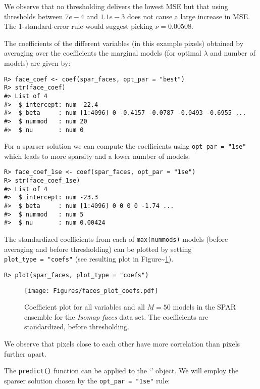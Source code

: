 \documentclass[
  article]{jss}
\newcommand{\class}[1]{`\code{#1}'}
\begin{document}
We observe that no thresholding delivers the lowest MSE but that using
thresholds between \(7e-4\) and \(1.1e-3\) does not cause a large
increase in MSE. The 1-standard-error rule would suggest picking
\(\nu=0.00508\).

The coefficients of the different variables (in this example pixels)
obtained by averaging over the coefficients the marginal models (for
optimal \(\lambda\) and number of models) are given by:

\begin{verbatim}
R> face_coef <- coef(spar_faces, opt_par = "best")
R> str(face_coef)
#> List of 4
#>  $ intercept: num -22.4
#>  $ beta     : num [1:4096] 0 -0.4157 -0.0787 -0.0493 -0.6955 ...
#>  $ nummod   : num 20
#>  $ nu       : num 0
\end{verbatim}

For a sparser solution we can compute the coefficients using
\texttt{opt\_par\ =\ "1se"} which leads to more sparsity and a lower
number of models.

\begin{verbatim}
R> face_coef_1se <- coef(spar_faces, opt_par = "1se")
R> str(face_coef_1se)
#> List of 4
#>  $ intercept: num -23.3
#>  $ beta     : num [1:4096] 0 0 0 0 -1.74 ...
#>  $ nummod   : num 5
#>  $ nu       : num 0.00424
\end{verbatim}

The standardized coefficients from each of \texttt{max(nummods)} models
(before averaging and before thresholding) can be plotted by setting
\texttt{plot\_type\ =\ "coefs"} (see resulting plot in
Figure\textasciitilde{}\ref{fig:faces_coefs}).

\begin{verbatim}
R> plot(spar_faces, plot_type = "coefs")
\end{verbatim}

\begin{figure}[t!]
\centering
\texttt{[image: Figures/faces\_plot\_coefs.pdf]}
\caption{Coefficient plot for all variables and all $M=50$ models in the SPAR ensemble for the \emph{Isomap faces} data set. The coefficients are standardized, before thresholding.
\label{fig:faces_coefs}}
\end{figure}

We observe that pixels close to each other have more correlation than
pixels further apart.

The \texttt{predict()} function can be applied to the \class{spar.cv}
object. We will employ the sparser solution chosen by the
\texttt{opt\_par\ =\ "1se"} rule:
\end{document}
